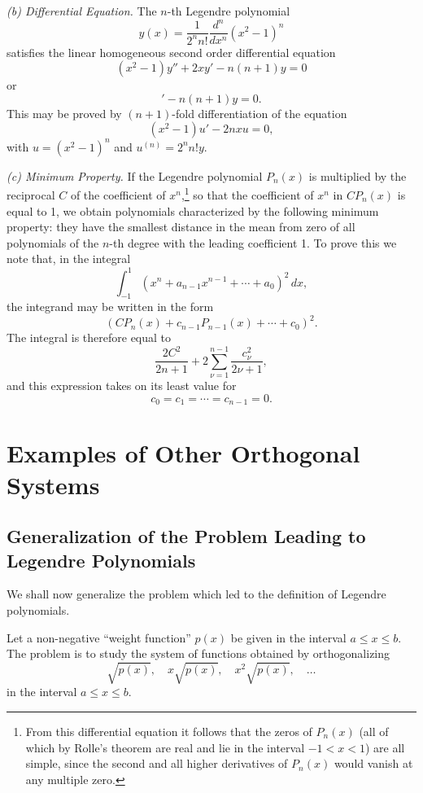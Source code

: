 \textit{(b) Differential Equation.} The $n$-th Legendre polynomial
\[
y(x)=\frac{1}{2^n n!}\frac{d^n}{dx^n}(x^2-1)^n
\]
satisfies the linear homogeneous second order differential equation
\begin{equation}
(x^2-1)y''+2xy'-n(n+1)y=0
\tag{20}
\end{equation}
or
\begin{equation}
[(x^2-1)y']'-n(n+1)y=0.
\tag{20'}
\end{equation}
This may be proved by $(n+1)$-fold differentiation of the equation
\[
(x^2-1)u'-2nxu=0,
\]
with $u=(x^2-1)^n$ and $u^{(n)}=2^n n!y$.

\textit{(c) Minimum Property.} If the Legendre polynomial $P_n(x)$ is multiplied by the reciprocal $C$ of the coefficient of $x^n$,\footnote{From this differential equation it follows that the zeros of $P_n(x)$ (all of which by Rolle's theorem are real and lie in the interval $-1<x<1$) are all simple, since the second and all higher derivatives of $P_n(x)$ would vanish at any multiple zero.} so that the coefficient of $x^n$ in $CP_n(x)$ is equal to 1, we obtain polynomials characterized by the following minimum property: they have the smallest distance in the mean from zero of all polynomials of the $n$-th degree with the leading coefficient 1. To prove this we note that, in the integral
\[
\int_{-1}^{1}(x^n+a_{n-1}x^{n-1}+\cdots+a_0)^2\,dx,
\]
the integrand may be written in the form
\[
(CP_n(x)+c_{n-1}P_{n-1}(x)+\cdots+c_0)^2.
\]
The integral is therefore equal to
\[
\frac{2C^2}{2n+1}+2\sum_{\nu=1}^{n-1}\frac{c_\nu^2}{2\nu+1},
\]
and this expression takes on its least value for
\[
c_0=c_1=\cdots=c_{n-1}=0.
\]

\section{Examples of Other Orthogonal Systems}
\subsection{Generalization of the Problem Leading to Legendre Polynomials}
We shall now generalize the problem which led to the definition of Legendre polynomials.

Let a non-negative ``weight function'' $p(x)$ be given in the interval $a\le x\le b$. The problem is to study the system of functions obtained by orthogonalizing
\[
\sqrt{p(x)},\quad x\sqrt{p(x)},\quad x^2\sqrt{p(x)},\quad\ldots
\]
in the interval $a\le x\le b$.

